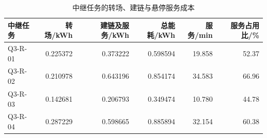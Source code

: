 \begin{table}[htbp]\centering\small
\caption{中继任务的转场、建链与悬停服务成本}\label{tab:rev_q3_relay_energy}
\begin{tabular}{lrrrrr}\toprule
中继任务 & 转场/kWh & 建链及服务/kWh & 总能耗/kWh & 服务/min & 服务占用比/\%\\\midrule
Q3-R-01 & 0.225372 & 0.373222 & 0.598594 & 19.858 & 52.37\\
Q3-R-02 & 0.210978 & 0.643196 & 0.854174 & 34.583 & 66.96\\
Q3-R-03 & 0.142681 & 0.206793 & 0.349474 & 10.780 & 44.78\\
Q3-R-04 & 0.287229 & 0.598665 & 0.885894 & 32.154 & 60.38\\
\bottomrule\end{tabular}
\end{table}
